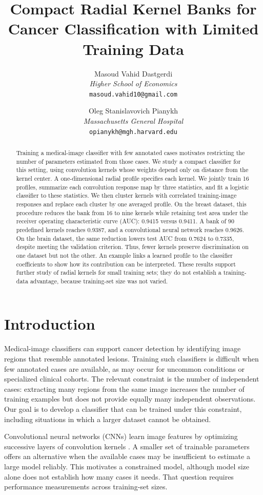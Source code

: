 \documentclass[10pt,twocolumn]{article}
\title{\vspace{-1.2em}\textbf{Compact Radial Kernel Banks for Cancer Classification with Limited Training Data}}
\author{Masoud Vahid Dastgerdi\\ \textit{Higher School of Economics}\\ \texttt{masoud.vahid10@gmail.com}
\and Oleg Stanislavovich Pianykh\\ \textit{Massachusetts General Hospital}\\ \texttt{opianykh@mgh.harvard.edu}}
\date{}
\begin{document}
\maketitle

\begin{abstract}
Training a medical-image classifier with few annotated cases motivates restricting the number of parameters estimated from those cases. We study a compact classifier for this setting, using convolution kernels whose weights depend only on distance from the kernel center. A one-dimensional radial profile specifies each kernel. We jointly train 16 profiles, summarize each convolution response map by three statistics, and fit a logistic classifier to these statistics. We then cluster kernels with correlated training-image responses and replace each cluster by one averaged profile. On the breast dataset, this procedure reduces the bank from 16 to nine kernels while retaining test area under the receiver operating characteristic curve (AUC): 0.9415 versus 0.9411. A bank of 90 predefined kernels reaches 0.9387, and a convolutional neural network reaches 0.9626. On the brain dataset, the same reduction lowers test AUC from 0.7624 to 0.7335, despite meeting the validation criterion. Thus, fewer kernels preserve discrimination on one dataset but not the other. An example links a learned profile to the classifier coefficients to show how its contribution can be interpreted. These results support further study of radial kernels for small training sets; they do not establish a training-data advantage, because training-set size was not varied.
\end{abstract}

\section{Introduction}
Medical-image classifiers can support cancer detection by identifying image regions that resemble annotated lesions. Training such classifiers is difficult when few annotated cases are available, as may occur for uncommon conditions or specialized clinical cohorts. The relevant constraint is the number of independent cases: extracting many regions from the same image increases the number of training examples but does not provide equally many independent observations. Our goal is to develop a classifier that can be trained under this constraint, including situations in which a larger dataset cannot be obtained.

Convolutional neural networks (CNNs) learn image features by optimizing successive layers of convolution kernels \cite{krizhevsky2012,litjens2017}. A smaller set of trainable parameters offers an alternative when the available cases may be insufficient to estimate a large model reliably. This motivates a constrained model, although model size alone does not establish how many cases it needs. That question requires performance measurements across training-set sizes.
\end{document}
